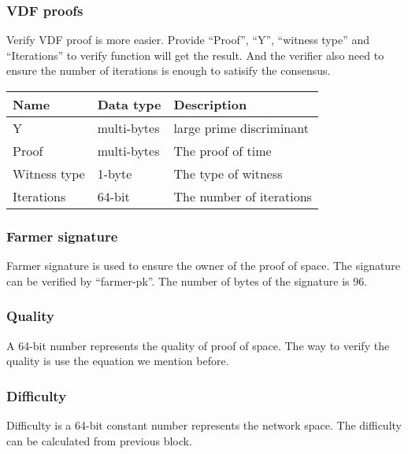 \subsubsection{VDF proofs}
\begin{flushleft}
    Verify VDF proof is more easier. Provide ``Proof'', ``Y'', ``witness type'' and ``Iterations'' to verify function will get the result. And the verifier also need to ensure the number of iterations is enough to satisify the consensus.
\end{flushleft}
\begin{tabular}{ |p{3cm}|p{3cm}|p{6cm}| }
    \hline
    \rowcolor{lightgray}\textbf{Name} & \textbf{Data type} & \textbf{Description} \\[5pt]
    \hline
    Y & multi-bytes & large prime discriminant \\[5pt]
    \rowcolor{lightgray!30} Proof & multi-bytes & The proof of time \\[5pt]
    Witness type & 1-byte & The type of witness \\[5pt]
    \rowcolor{lightgray!30} Iterations & 64-bit & The number of iterations \\[5pt]
    \hline
\end{tabular}
\subsubsection{Farmer signature}
\begin{flushleft}
    Farmer signature is used to ensure the owner of the proof of space. The signature can be verified by ``farmer-pk''. The number of bytes of the signature is 96.
\end{flushleft}
\subsubsection{Quality}
\begin{flushleft}
    A 64-bit number represents the quality of proof of space. The way to verify the quality is use the equation we mention before.
\end{flushleft}
\subsubsection{Difficulty}
\begin{flushleft}
    Difficulty is a 64-bit constant number represents the network space. The difficulty can be calculated from previous block.
\end{flushleft}
